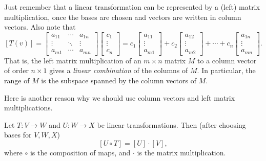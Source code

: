 \documentclass[11pt]{article}
\begin{document}
Just remember that a linear transformation can be represented by a (left) matrix multiplication, once the bases are chosen and vectors are written in column vectors.
Also note that
\[
  [T(v)] = 
  \begin{bmatrix}
    a_{11} & \cdots & a_{1n} \\ \vdots & \ddots & \vdots \\ a_{m1} & \cdots & a_{mn}
  \end{bmatrix}
  \begin{bmatrix}
    c_1 \\ \vdots \\ c_n
  \end{bmatrix} =
  c_1 \begin{bmatrix} a_{11} \\ \vdots \\ a_{m1} \end{bmatrix} +
  c_2 \begin{bmatrix} a_{12} \\ \vdots \\ a_{m2} \end{bmatrix} + \cdots +
  c_n \begin{bmatrix} a_{1n} \\ \vdots \\ a_{mn} \end{bmatrix}.
\]
That is, the left matrix multiplication of an $m \times n$ matrix $M$ to a column vector of order $n \times 1$ gives a \textit{linear combination} of the columns of $M$.
In particular, the range of $M$ is the subspace spanned by the column vectors of $M$.

Here is another reason why we should use column vectors and left matrix multiplications.
\begin{thm}
  Let $T : V \to W$ and $U : W \to X$ be linear transformations.
  Then (after choosing bases for $V, W, X$)
  \[
    [U \circ T] = [U] \cdot [V],
  \]
  where $\circ$ is the composition of maps, and $\cdot$ is the matrix multiplication.
\end{thm}
\end{document}
